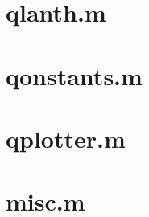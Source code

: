 \documentclass{article}
\begin{document}
\newpage
\section{qlanth.m}



\section{qonstants.m} 



\section{qplotter.m}



\section{misc.m}


\end{document}
